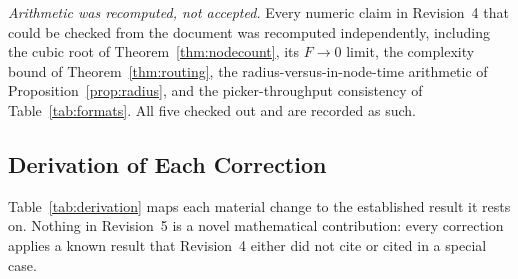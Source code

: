 \emph{Arithmetic was recomputed, not accepted.} Every numeric claim in Revision~4 that could be checked from the document was recomputed independently, including the cubic root of Theorem~\ref{thm:nodecount}, its $F\to0$ limit, the complexity bound of Theorem~\ref{thm:routing}, the radius-versus-in-node-time arithmetic of Proposition~\ref{prop:radius}, and the picker-throughput consistency of Table~\ref{tab:formats}. All five checked out and are recorded as such.

\subsection{Derivation of Each Correction}

Table~\ref{tab:derivation} maps each material change to the established result it rests on. Nothing in Revision~5 is a novel mathematical contribution: every correction applies a known result that Revision~4 either did not cite or cited in a special case.

